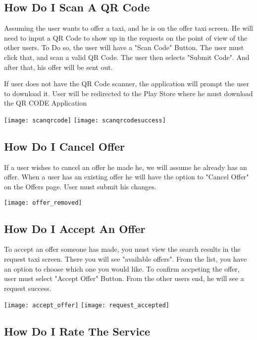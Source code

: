 \documentclass[english]{article}
\begin{document}
\subsection{How Do I Scan A QR Code}

Assuming the user wants to offer a taxi, and he is on the offer taxi screen. He will need to input a QR Code to show up in the requests on the point of view of the other users. To Do so, the user will have a "Scan Code" Button. The user must click that, and scan a valid QR Code. The user then selects "Submit Code". And after that, his offer will be sent out.

\medskip 

If user does not have the QR Code scanner, the application will prompt the user to download it. User will be redirected to the Play Store where he must download the QR CODE Application

\texttt{[image: scanqrcode]}
\texttt{[image: scanqrcodesuccess]}

\subsection{How Do I Cancel Offer}

If a user wishes to cancel an offer he made he, we will assume he already has an offer. When a user has an existing offer he will have the option to "Cancel Offer" on the Offers page. User must submit his changes. 

\texttt{[image: offer\_removed]}

\subsection{How Do I Accept An Offer}

To accept an offer someone has made, you must view the search results in the request taxi screen. There you will see "available offers". From the list, you have an option to choose which one you would like. To confirm accpeting the offer, user must select "Accept Offer" Button. From the other users end, he will see a request success. 

\texttt{[image: accept\_offer]}
\texttt{[image: request\_accepted]}

\subsection{How Do I Rate The Service}
\end{document}
